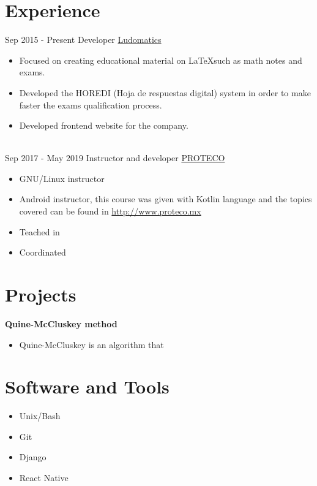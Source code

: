 \documentclass[letterpaper]{twentysecondcv} %
\begin{document}
\makeprofile %


\section{Experience}

\begin{twenty} %
	\twentyitem
    {Sep 2015 -}
		{Present}
        {Developer}
        {\href{http://www.ludmatics.org/}{Ludomatics}}
        {}
        {
        {\begin{itemize}
        \item Focused on creating educational material on \LaTeX such as math notes and exams.
        \item Developed the HOREDI (Hoja de respuestas digital) system in order to make faster the exams qualification process.
        \item Developed frontend website for the company.
    \end{itemize}}
        }
    \\
    \twentyitem
   		{Sep 2017 -}
		{May 2019}
        {Instructor and developer}
        {\href{http://www.proteco.mx}{PROTECO}}
        {}
        {
        {\begin{itemize}
        \item GNU/Linux instructor
				\item Android instructor, this course was given with Kotlin language and the topics covered can be found in \href{http://www.proteco.mx}{http://www.proteco.mx}
        \item Teached in
				\item Coordinated
    \end{itemize}}
        }

\end{twenty}


\section{Projects}

\textbf{Quine-McCluskey method}
\begin{itemize}
	\item Quine-McCluskey is an algorithm that
\end{itemize}

\section{Software and Tools}

\begin{itemize}
	\item Unix/Bash
	\item Git
	\item Django
	\item React Native
\end{itemize}
\end{document}
